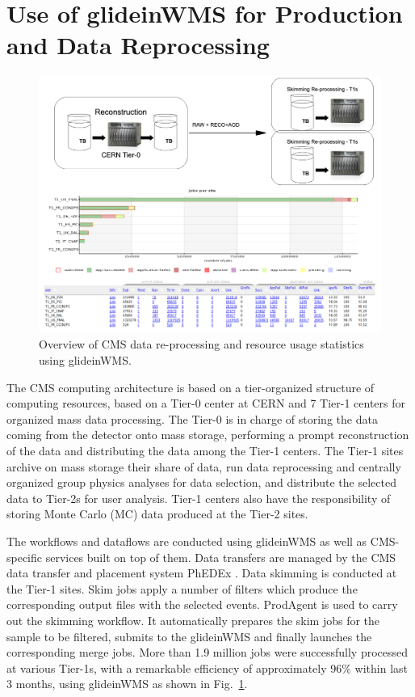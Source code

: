 \documentclass[a4paper]{jpconf}
\begin{document}
\section{Use of glideinWMS for Production and Data Reprocessing }
\begin{figure}
\begin{center}
\includegraphics[scale=0.5]{DataReprocess}
\end{center}
\caption{Overview of CMS data re-processing and resource usage statistics using glideinWMS.}
\label{fig:reprocessT1s}
\end{figure}
The CMS computing architecture \cite{bib:cms_computing_arch} is based on a tier-organized structure of computing
resources, based on a Tier-0 center at CERN and 7 Tier-1 centers for organized mass data processing. 
The Tier-0 is in charge of storing the data coming from the detector onto mass storage, performing a prompt 
reconstruction of the data and distributing the data among the Tier-1 centers. The Tier-1 sites archive on
mass storage their share of data, run data reprocessing and centrally organized group physics analyses for data selection, 
and distribute the selected data to Tier-2s for user analysis. Tier-1 centers also
have the responsibility of storing Monte Carlo (MC) data produced at the Tier-2 sites. 

The workflows and dataflows are conducted using glideinWMS  as well as CMS-specific services 
built on top of them. Data transfers are managed by the CMS data transfer and placement 
system PhEDEx \cite{bib:cms_phedex}. Data skimming is conducted at the Tier-1 sites. Skim jobs apply a number of filters which produce the 
corresponding output files with the selected events. ProdAgent is used to carry out the skimming workflow. 
It automatically prepares the skim jobs for the sample to be filtered, submits to the glideinWMS and finally
launches the corresponding merge jobs. More than 1.9 million jobs were successfully processed at various 
Tier-1s, with a remarkable efficiency of approximately 96\% within last 3 months, using glideinWMS as shown 
in Fig.~\ref{fig:reprocessT1s}.
\end{document}

